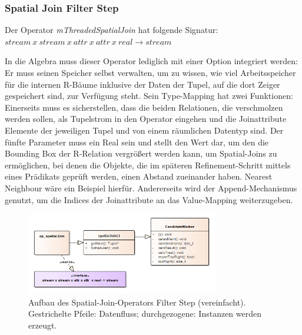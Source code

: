 \documentclass[a4paper,12pt,twoside]{article}
\newcommand{\Fb}[1]{\textit{#1}} %
\begin{document}
\subsubsection{Spatial Join Filter Step}

Der Operator \Fb{mThreadedSpatialJoin} hat folgende Signatur: \newline
$stream~x~stream~x~attr~x~attr~x~real \longrightarrow stream$

In die Algebra muss dieser Operator lediglich mit einer Option integriert werden: Er muss seinen Speicher selbst verwalten, um zu wissen, wie viel Arbeitsspeicher für die internen R-Bäume inklusive der Daten der Tupel, auf die dort Zeiger gespeichert sind, zur Verfügung steht. Sein Type-Mapping hat zwei Funktionen: Einerseits muss es sicherstellen, dass die beiden Relationen, die verschmolzen werden sollen, als Tupelstrom in den Operator eingehen und die Joinattribute Elemente der jeweiligen Tupel und von einem räumlichen Datentyp sind. Der fünfte Parameter muss ein Real sein und stellt den Wert dar, um den die Bounding Box der R-Relation vergrößert werden kann, um Spatial-Joins zu ermöglichen, bei denen die Objekte, die im späteren Refinement-Schritt mittels eines Prädikats geprüft werden, einen Abstand zueinander haben. Nearest Neighbour wäre ein Beispiel hierfür. Andererseits wird der Append-Mechanismus genutzt, um die Indices der Joinattribute an das Value-Mapping weiterzugeben.

\begin{figure}
	\centering
	\includegraphics[width=0.75\textwidth]{Bilder/spatialJoin.png}
	\caption{Aufbau des Spatial-Join-Operators Filter Step (vereinfacht). Gestrichelte Pfeile: Datenfluss; durchgezogene: Instanzen werden erzeugt.}
	\label{img:KlassSJ}
\end{figure}
\end{document}
